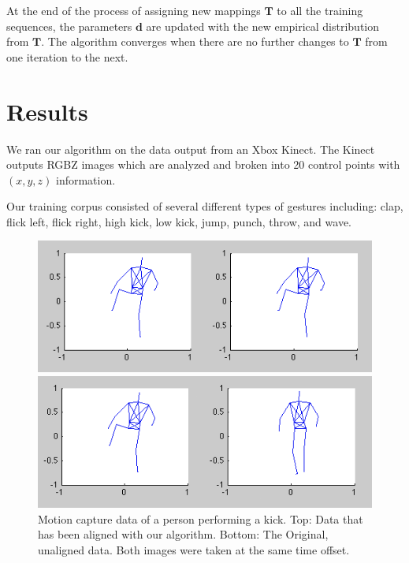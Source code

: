 \documentclass{article}
\begin{document}
At the end of the process of assigning new mappings $\mathbf{T}$ to all the training
sequences, the parameters $\mathbf{d}$ are updated with the new empirical
distribution from $\mathbf{T}$. The algorithm converges when there are no further
changes to $\mathbf{T}$ from one iteration to the next.

\section{Results}

We ran our algorithm on the data output from an Xbox Kinect. The Kinect outputs
RGBZ images which are analyzed and broken into 20 control points with
$\left(x,y,z\right)$ information.

Our training corpus consisted of several different types of gestures including:
clap, flick left, flick right, high kick, low kick, jump, punch, throw, and
wave. 



\begin{figure}
\begin{centering}

\begin{centering}
\includegraphics[width=\columnwidth]{figures/kick_aligned.png}	
\end{centering}
\begin{centering}
\includegraphics[width=\columnwidth]{figures/kick_unaligned.png}	
\end{centering}

\vspace{-0.2in}

\caption{Motion capture data of a person performing a kick. Top:
 Data that has
been aligned with our algorithm. Bottom: The Original, unaligned data. Both
images were taken at the same time offset. \label{figure:kick}}

\end{centering}
\end{figure}
\end{document}
